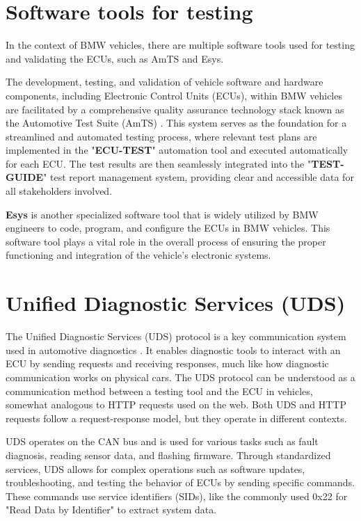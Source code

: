 \section{Software tools for testing}
In the context of BMW vehicles, there are multiple software tools used for testing and validating the ECUs, such as AmTS and Esys.

The development, testing, and validation of vehicle software and hardware components, including Electronic Control Units (ECUs), within BMW vehicles are facilitated by a comprehensive quality assurance technology stack known as the Automotive Test Suite (AmTS) \cite{automotive_test_suite_2022}. This system serves as the foundation for a streamlined and automated testing process, where relevant test plans are implemented in the "\textbf{ECU-TEST}" automation tool and executed automatically for each ECU. The test results are then seamlessly integrated into the "\textbf{TEST-GUIDE}" test report management system, providing clear and accessible data for all stakeholders involved.

\textbf{Esys} is another specialized software tool that is widely utilized by BMW engineers to code, program, and configure the ECUs in BMW vehicles. This software tool plays a vital role in the overall process of ensuring the proper functioning and integration of the vehicle's electronic systems.


\section{Unified Diagnostic Services (UDS)}
The Unified Diagnostic Services (UDS) protocol is a key communication system used in automotive diagnostics \cite{iso_14229}. It enables diagnostic tools to interact with an ECU by sending requests and receiving responses, much like how diagnostic communication works on physical cars. The UDS protocol can be understood as a communication method between a testing tool and the ECU in vehicles, somewhat analogous to HTTP requests used on the web. Both UDS and HTTP requests follow a request-response model, but they operate in different contexts.

UDS operates on the CAN bus and is used for various tasks such as fault diagnosis, reading sensor data, and flashing firmware. Through standardized services, UDS allows for complex operations such as software updates, troubleshooting, and testing the behavior of ECUs by sending specific commands. These commands use service identifiers (SIDs), like the commonly used 0x22 for "Read Data by Identifier" to extract system data\cite{uds_tutorial}.


